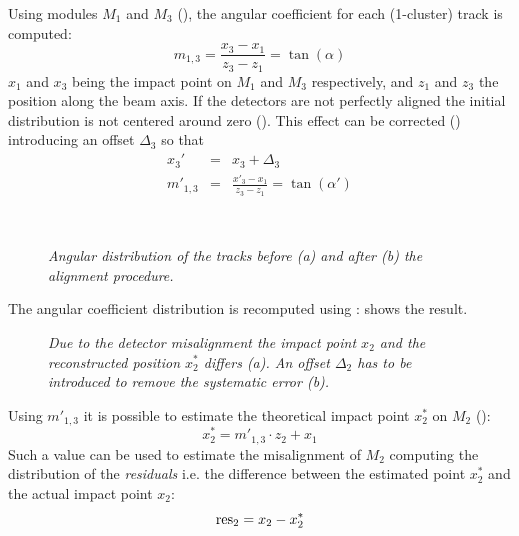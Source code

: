 Using modules $M_1$ and $M_3$ (), the
angular coefficient for each (1-cluster) track is computed:
\begin{equation}\label{eq:m13}
m_{1,3} = \frac{x_3-x_1}{z_3-z_1} = \tan{(\alpha)}
\end{equation}
$x_1$ and $x_3$ being the impact point on $M_1$ and $M_3$ respectively, and $z_1$
and $z_3$ the position along the beam axis.  If the detectors are not perfectly
aligned the initial distribution is not centered around zero
(). This effect can be corrected ()
introducing an offset $\Delta_3$ so that
\begin{eqnarray}
x_3' & = & x_3 + \Delta_3 \label{eq:correzione3}\\
m'_{1,3} &=& \frac{x'_3-x_1}{z_3-z_1} = \tan{(\alpha')}\label{eq:m13corretta}
\end{eqnarray}
\begin{figure}[!htbp]
  \centering 
  \\
  \caption{ {\it Angular distribution of the tracks before (a) and after (b) the
    alignment procedure.}}
  \label{fig:tan_alpha}
\end{figure}
The angular coefficient distribution is recomputed using :
 shows the result.\\
\begin{figure}[!htbp]
  \centering 
  \subfloat[] {  \label{fig:align2_a} }
  \subfloat[] {  \label{fig:align2_b} }
  \caption{\it Due to the detector misalignment the impact point $x_2$ and the
    reconstructed position $x_2^*$ differs (a). An offset $\Delta_2$ has to be
    introduced to remove the systematic error (b).}
  \label{fig:align2}
\end{figure} 
Using $m'_{1,3}$ it is
possible to estimate the theoretical impact point $x_2^*$ on $M_2$ ():
\begin{equation}\label{eq:x2_teorico}
x_2^* = m'_{1,3}\cdot z_2 + x_1
\end{equation}
Such a value can be used to estimate the misalignment of $M_2$ computing the
distribution of the {\em residuals} i.e. the difference between the estimated
point $x_2^*$ and the actual impact point $x_2$:
\begin{equation}
{\rm res}_2 = x_2-x_2^*
\end{equation}

